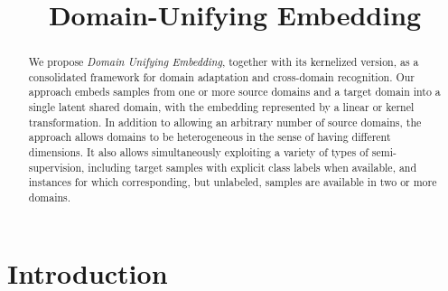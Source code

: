 \documentclass[10pt,twocolumn,letterpaper]{article}
\begin{document}
\title{Domain-Unifying Embedding}

\maketitle

\begin{abstract}
We propose \textit{Domain Unifying Embedding}, together with its kernelized version, as a consolidated framework for domain adaptation and cross-domain recognition. Our approach embeds samples from one or more source domains and a target domain into a single latent shared domain, with the embedding represented by a linear or kernel transformation. In addition to allowing an arbitrary number of source domains, the approach allows domains to be heterogeneous in the sense of having different dimensions. It also allows simultaneously exploiting a variety of types of semi-supervision, including target samples with explicit class labels when available, and instances for which corresponding, but unlabeled, samples are available in two or more domains.
\end{abstract}

\section{Introduction}
\end{document}
